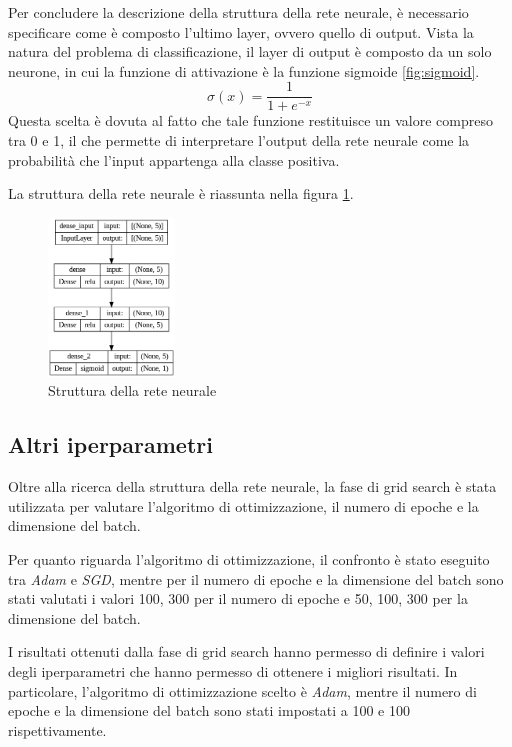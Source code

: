 Per concludere la descrizione della struttura della rete neurale, è necessario
specificare come è composto l'ultimo layer, ovvero quello di output. Vista la
natura del problema di classificazione, il layer di output è composto da un solo
neurone, in cui la funzione di attivazione è la funzione sigmoide \ref{fig:sigmoid}.
\begin{equation}
    \sigma(x) = \frac{1}{1 + e^{-x}}
\end{equation}
Questa scelta è dovuta al fatto che tale funzione restituisce un valore compreso
tra 0 e 1, il che permette di interpretare l'output della rete neurale come la
probabilità che l'input appartenga alla classe positiva.

La struttura della rete neurale è riassunta nella figura \ref{fig:strutturaReteNeurale}.
\begin{figure}[!ht]
    \centering
    \includegraphics[width=0.3\textwidth]{img/rete/struttura_rete.png}
    \caption{Struttura della rete neurale}
    \label{fig:strutturaReteNeurale}
\end{figure}
\subsection{Altri iperparametri} %
Oltre alla ricerca della struttura della rete neurale, la fase di grid search è
stata utilizzata per valutare l'algoritmo di ottimizzazione, il numero di epoche
e la dimensione del batch.

Per quanto riguarda l'algoritmo di ottimizzazione, il confronto è stato eseguito
tra \textit{Adam} e \textit{SGD}, mentre per il numero di epoche e la dimensione
del batch sono stati valutati i valori 100, 300 per il numero di epoche e 50,
100, 300 per la dimensione del batch.

I risultati ottenuti dalla fase di grid search hanno permesso di definire i valori
degli iperparametri che hanno permesso di ottenere i migliori risultati. In
particolare, l'algoritmo di ottimizzazione scelto è \textit{Adam}, mentre il
numero di epoche e la dimensione del batch sono stati impostati a 100 e 100
rispettivamente.

